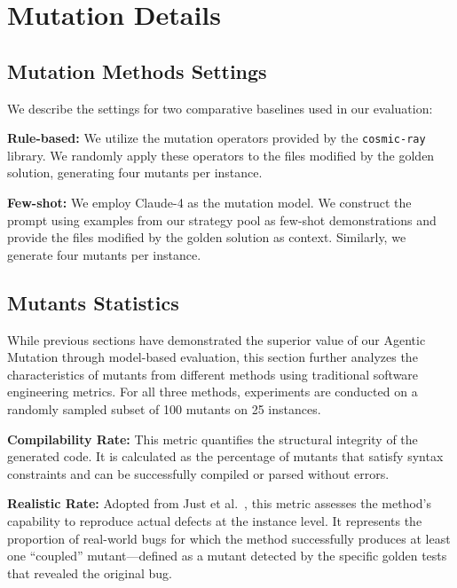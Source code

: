 \documentclass[11pt]{article}
\begin{document}
\section{Mutation Details}
\label{sec:Mutation Details}
\subsection{Mutation Methods Settings}
\label{sec:Mutation Methods Settings}
We describe the settings for two comparative baselines used in our evaluation:

\textbf{Rule-based:} We utilize the mutation operators provided by the \texttt{cosmic-ray} library. We randomly apply these operators to the files modified by the golden solution, generating four mutants per instance.

\textbf{Few-shot:} We employ Claude-4 as the mutation model. We construct the prompt using examples from our strategy pool as few-shot demonstrations and provide the files modified by the golden solution as context. Similarly, we generate four mutants per instance.

\subsection{Mutants Statistics}
While previous sections have demonstrated the superior value of our Agentic Mutation through model-based evaluation, this section further analyzes the characteristics of mutants from different methods using traditional software engineering metrics. For all three methods, experiments are conducted on a randomly sampled subset of 100 mutants on 25 instances.
\label{sec:Mutants Statistics}

\textbf{Compilability Rate:} This metric quantifies the structural integrity of the generated code. It is calculated as the percentage of mutants that satisfy syntax constraints and can be successfully compiled or parsed without errors.
    
 \textbf{Realistic Rate:} Adopted from Just et al.~\citep{just2014mutants}, this metric assesses the method's capability to reproduce actual defects at the instance level. It represents the proportion of real-world bugs for which the method successfully produces at least one ``coupled'' mutant—defined as a mutant detected by the specific golden tests that revealed the original bug.
    
\end{document}
